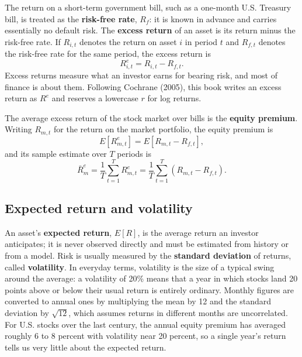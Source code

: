The return on a short-term government bill, such as a one-month U.S. Treasury bill, is treated as the \textbf{risk-free rate}, $R_f$: it is known in advance and carries essentially no default risk. 
The \textbf{excess return} of an asset is its return minus the risk-free rate. If $R_{i,t}$ denotes the return on asset $i$ in period $t$ and $R_{f,t}$ denotes the risk-free rate for the same period, the excess return is
\begin{equation}
R^{e}_{i,t} = R_{i,t} - R_{f,t}.
\label{eq:excess-return}
\end{equation}
Excess returns measure what an investor earns for bearing risk, and most of finance is about them. Following Cochrane (2005), this book writes an excess return as $R^{e}$ and reserves a lowercase $r$ for log returns.

The average excess return of the stock market over bills is the \textbf{equity premium}. Writing $R_{m,t}$ for the return on the market portfolio, the equity premium is
\begin{equation}
E\left[R^{e}_{m,t}\right] = E\left[R_{m,t} - R_{f,t}\right],
\label{eq:equity-premium}
\end{equation}
and its sample estimate over $T$ periods is
\begin{equation}
\bar{R}^{e}_{m} = \frac{1}{T}\sum_{t=1}^{T} R^{e}_{m,t} = \frac{1}{T}\sum_{t=1}^{T}\left(R_{m,t} - R_{f,t}\right).
\label{eq:equity-premium-sample}
\end{equation}




\subsection{Expected return and volatility}
\label{sec:01-expret}

An asset's \textbf{expected return}, $E[R]$, is the average return an investor anticipates; it is never observed directly and must be estimated from history or from a model. Risk is usually measured by the \textbf{standard deviation} of returns, called \textbf{volatility}. In everyday terms, volatility is the size of a typical swing around the average: a volatility of 20\% means that a year in which stocks land 20 points above or below their usual return is entirely ordinary. Monthly figures are converted to annual ones by multiplying the mean by 12 and the standard deviation by $\sqrt{12}$, which assumes returns in different months are uncorrelated. For U.S. stocks over the last century, the annual equity premium has averaged roughly 6 to 8 percent with volatility near 20 percent, so a single year's return tells us very little about the expected return.

